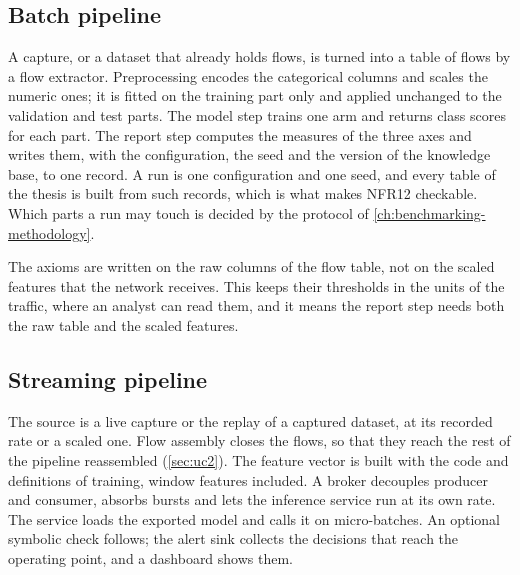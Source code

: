 \subsection{Batch pipeline}
\label{sec:batch-pipeline}

A capture, or a dataset that already holds flows, is turned into a table of
flows by a flow extractor. Preprocessing encodes the categorical columns and
scales the numeric ones; it is fitted on the training part only and applied
unchanged to the validation and test parts. The model step trains one arm and
returns class scores for each part. The report step computes the measures of the
three axes and writes them, with the configuration, the seed and the version of
the knowledge base, to one record. A run is one configuration and one seed, and
every table of the thesis is built from such records, which is what makes NFR12
checkable. Which parts a run may touch is decided by the protocol of
\cref{ch:benchmarking-methodology}.

The axioms are written on the raw columns of the flow table, not on the scaled
features that the network receives. This keeps their thresholds in the units of
the traffic, where an analyst can read them, and it means the report step needs
both the raw table and the scaled features.

\subsection{Streaming pipeline}
\label{sec:streaming-pipeline}

The source is a live capture or the replay of a captured dataset, at its
recorded rate or a scaled one. Flow assembly closes the flows, so that they reach
the rest of the pipeline reassembled (\cref{sec:uc2}). The feature vector is built
with the code and definitions of training, window features included. A broker
decouples producer and consumer, absorbs bursts and lets the inference service run
at its own rate. The service loads the exported model and calls it on micro-batches.
An optional symbolic check follows; the alert sink collects the decisions that
reach the operating point, and a dashboard shows them.

